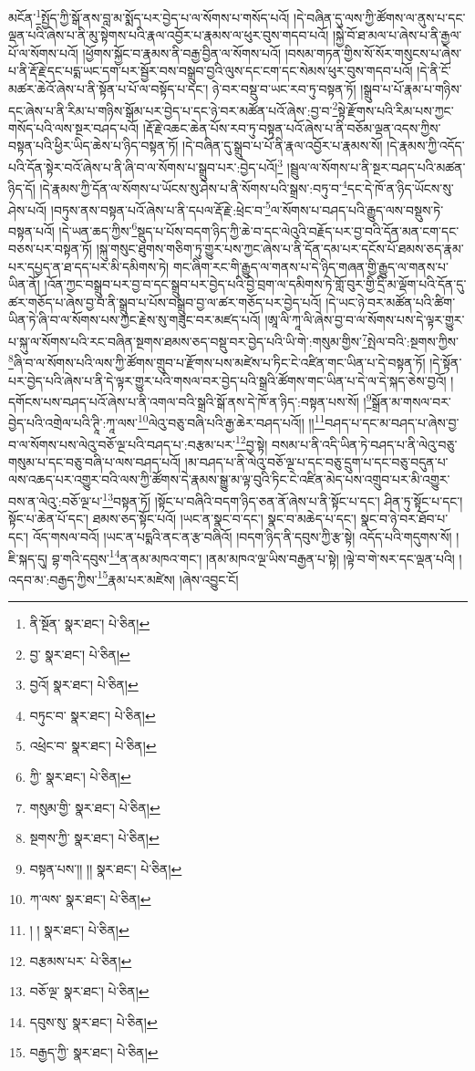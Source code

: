 མངོན་\footnote{ནི་སྔོན་  སྣར་ཐང་།  པེ་ཅིན། }སྤྱོད་ཀྱི་སྒོ་ནས་བླ་མ་སྨོད་པར་བྱེད་པ་ལ་སོགས་པ་གསོད་པའོ། །དེ་བཞིན་དུ་ལས་ཀྱི་ཚོགས་ལ་ནུས་པ་དང་ལྡན་པའི་ཞེས་པ་ནི་མུ་སྟེགས་པའི་རྣལ་འབྱོར་པ་རྣམས་ལ་ཕུར་བུས་གདབ་པའོ། །སྐྱེ་བོ་ཐ་མལ་པ་ཞེས་པ་ནི་རྒྱལ་པོ་ལ་སོགས་པའོ། །ཕྱོགས་སྐྱོང་བ་རྣམས་ནི་བརྒྱ་བྱིན་ལ་སོགས་པའོ། །བསམ་གཏན་གྱིས་སོ་སོར་གསུངས་པ་ཞེས་པ་ནི་རྡོ་རྗེ་དང་པདྨ་ཡང་དག་པར་སྦྱོར་བས་བསྒྲུབ་བྱའི་ལུས་དང་ངག་དང་སེམས་ཕུར་བུས་གདབ་པའོ། །དེ་ནི་ངོ་མཚར་ཆེའོ་ཞེས་པ་ནི་སྟོན་པ་པོ་ལ་བསྟོད་པ་དང་། ཉེ་བར་བསྡུ་བ་ཡང་རབ་ཏུ་བསྟན་ཏོ། །སྒྲུབ་པ་པོ་རྣམ་པ་གཉིས་དང་ཞེས་པ་ནི་རིམ་པ་གཉིས་སྒོམ་པར་བྱེད་པ་དང་ཉེ་བར་མཚོན་པའོ་ཞེས་:བྱ་བ་\footnote{བྱ་  སྣར་ཐང་།  པེ་ཅིན། }སྟེ་རྫོགས་པའི་རིམ་པས་ཀྱང་གསོད་པའི་ལས་སྔར་བཤད་པའོ། །རྡོ་རྗེ་འཆང་ཆེན་པོས་རབ་ཏུ་བསྟན་པའོ་ཞེས་པ་ནི་བཅོམ་ལྡན་འདས་ཀྱིས་བསྟན་པའི་ཕྱིར་ཡིད་ཆེས་པ་ཉིད་བསྟན་ཏོ། །དེ་བཞིན་དུ་སྒྲུབ་པ་པོ་ནི་རྣལ་འབྱོར་པ་རྣམས་སོ། །དེ་རྣམས་ཀྱི་འདོད་པའི་དོན་སྟེར་བའོ་ཞེས་པ་ནི་ཞི་བ་ལ་སོགས་པ་སྒྲུབ་པར་:བྱེད་པའོ།\footnote{བྱའོ།  སྣར་ཐང་།  པེ་ཅིན། } །སྦྲུལ་ལ་སོགས་པ་ནི་སྔར་བཤད་པའི་མཚན་ཉིད་དོ། །དེ་རྣམས་ཀྱི་དོན་ལ་སོགས་པ་ཡོངས་སུ་ཤེས་པ་ནི་སོགས་པའི་སྒྲས་:བཏུ་བ་\footnote{བཏུང་བ་  སྣར་ཐང་།  པེ་ཅིན། }དང་དེ་ཁོ་ན་ཉིད་ཡོངས་སུ་ཤེས་པའོ། །བཏུས་ནས་བསྟན་པའོ་ཞེས་པ་ནི་དཔལ་རྡོ་རྗེ་:ཕྲེང་བ་\footnote{འཕྲེང་བ་  སྣར་ཐང་།  པེ་ཅིན། }ལ་སོགས་པ་བཤད་པའི་རྒྱུད་ལས་བསྡུས་ཏེ་བསྟན་པའོ། །དེ་ཡན་ཆད་ཀྱིས་\footnote{ཀྱི་  སྣར་ཐང་།  པེ་ཅིན། }སྡུད་པ་པོས་བདག་ཉིད་ཀྱི་ཆེ་བ་དང་ལེའུའི་བརྗོད་པར་བྱ་བའི་དོན་མན་ངག་དང་བཅས་པར་བསྟན་ཏོ། །སྐུ་གསུང་ཐུགས་གཅིག་ཏུ་གྱུར་པས་ཀྱང་ཞེས་པ་ནི་དོན་དམ་པར་དངོས་པོ་ཐམས་ཅད་རྣམ་པར་དཔྱད་ན་ཐ་དད་པར་མི་དམིགས་ཏེ། གང་ཞིག་རང་གི་རྒྱུད་ལ་གནས་པ་དེ་ཉིད་གཞན་གྱི་རྒྱུད་ལ་གནས་པ་ཡིན་ནོ། །འོན་ཀྱང་བསྒྲུབ་པར་བྱ་བ་དང་སྒྲུབ་པར་བྱེད་པའི་བྱེ་བྲག་ལ་དམིགས་ཏེ་གློ་བུར་གྱི་དྲི་མ་ལྡོག་པའི་དོན་དུ་ཚར་གཅོད་པ་ཞེས་བྱ་བ་ནི་སྒྲུབ་པ་པོས་བསྒྲུབ་བྱ་ལ་ཚར་གཅོད་པར་བྱེད་པའོ། །དེ་ཡང་ཉེ་བར་མཚོན་པའི་ཚིག་ཡིན་ཏེ་ཞི་བ་ལ་སོགས་པས་ཀྱང་རྗེས་སུ་གཟུང་བར་མཛད་པའོ། །ཨཱ་ལི་ཀཱ་ལི་ཞེས་བྱ་བ་ལ་སོགས་པས་དེ་ལྟར་གྱུར་པ་སྐུ་ལ་སོགས་པའི་རང་བཞིན་སྔགས་ཐམས་ཅད་བསྡུ་བར་བྱེད་པའི་ཡི་གེ་:གསུམ་གྱིས་\footnote{གསུམ་གྱི་  སྣར་ཐང་།  པེ་ཅིན། }སྤེལ་བའི་:སྔགས་ཀྱིས་\footnote{སྔགས་ཀྱི་  སྣར་ཐང་།  པེ་ཅིན། }ཞི་བ་ལ་སོགས་པའི་ལས་ཀྱི་ཚོགས་གྲུབ་པ་རྫོགས་པས་མཛེས་པ་ཏིང་ངེ་འཛིན་གང་ཡིན་པ་དེ་བསྟན་ཏོ། །དེ་སྟོན་པར་བྱེད་པའི་ཞེས་པ་ནི་དེ་ལྟར་གྱུར་པའི་གསལ་བར་བྱེད་པའི་སྒྲའི་ཚོགས་གང་ཡིན་པ་དེ་ལ་དེ་སྐད་ཅེས་བྱའོ། །དགོངས་པས་བཤད་པའོ་ཞེས་པ་ནི་འགལ་བའི་སྒྲའི་སྒོ་ནས་དེ་ཁོ་ན་ཉིད་:བསྟན་པས་སོ། །\footnote{བསྟན་པས་།། །།  སྣར་ཐང་།  པེ་ཅིན། }སྒྲོན་མ་གསལ་བར་བྱེད་པའི་འགྲེལ་པའི་ཊཱི་:ཀཱ་ལས་\footnote{ཀ་ལས་  སྣར་ཐང་།  པེ་ཅིན། }ལེའུ་བཅུ་བཞི་པའི་རྒྱ་ཆེར་བཤད་པའོ།། །།\footnote{། །  སྣར་ཐང་།  པེ་ཅིན། }བཤད་པ་དང་མ་བཤད་པ་ཞེས་བྱ་བ་ལ་སོགས་པས་ལེའུ་བཅོ་ལྔ་པའི་བཤད་པ་:བརྩམ་པར་\footnote{བརྩམས་པར་  པེ་ཅིན། }བྱ་སྟེ། བསམ་པ་ནི་འདི་ཡིན་ཏེ་བཤད་པ་ནི་ལེའུ་བཅུ་གསུམ་པ་དང་བཅུ་བཞི་པ་ལས་བཤད་པའོ། །མ་བཤད་པ་ནི་ལེའུ་བཅོ་ལྔ་པ་དང་བཅུ་དྲུག་པ་དང་བཅུ་བདུན་པ་ལས་འཆད་པར་འགྱུར་བའི་ལས་ཀྱི་ཚོགས་དེ་རྣམས་སྒྱུ་མ་ལྟ་བུའི་ཏིང་ངེ་འཛིན་མེད་པས་འགྲུབ་པར་མི་འགྱུར་བས་ན་ལེའུ་:བཅོ་ལྔ་པ་\footnote{བཅོ་ལྔ་  སྣར་ཐང་།  པེ་ཅིན། }བསྟན་ཏོ། །སྟོང་པ་བཞིའི་བདག་ཉིད་ཅན་ནོ་ཞེས་པ་ནི་སྟོང་པ་དང་། ཤིན་ཏུ་སྟོང་པ་དང་། སྟོང་པ་ཆེན་པོ་དང་། ཐམས་ཅད་སྟོང་པའོ། །ཡང་ན་སྣང་བ་དང་། སྣང་བ་མཆེད་པ་དང་། སྣང་བ་ཉེ་བར་ཐོབ་པ་དང་། འོད་གསལ་བའོ། །ཡང་ན་པདྨའི་ནང་ན་རྩ་བཞིའོ། །བདག་ཉིད་ནི་དབུས་ཀྱི་རྩ་སྟེ། འདོད་པའི་གདུགས་སོ། །ཇི་སྐད་དུ། བྷ་གའི་དབུས་\footnote{དབུས་སུ་  སྣར་ཐང་།  པེ་ཅིན། }ན་ནམ་མཁའ་གང་། །ནམ་མཁའ་ལྔ་ཡིས་བརྒྱན་པ་སྟེ། །ལྟེ་བ་གེ་སར་དང་ལྡན་པའི། །འདབ་མ་:བརྒྱད་ཀྱིས་\footnote{བརྒྱད་ཀྱི་  སྣར་ཐང་།  པེ་ཅིན། }རྣམ་པར་མཛེས། །ཞེས་འབྱུང་ངོ། 